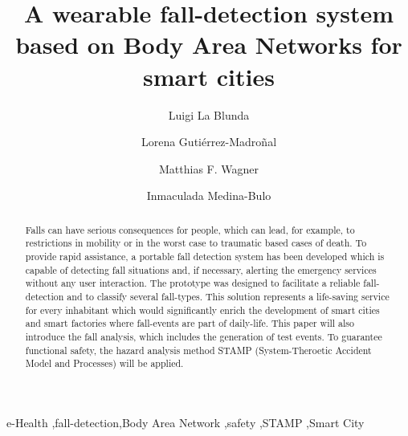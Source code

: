 \documentclass[review]{elsarticle}
\begin{document}
\begin{frontmatter}

\title{A wearable fall-detection system based on Body Area Networks for smart cities}

\author{Luigi La Blunda}
\author{Lorena Guti\'errez-Madro\~nal}
\author{Matthias F. Wagner}
\author{Inmaculada Medina-Bulo}
\address[label1]{WSN and IOT Research Group Frankfurt University of Applied Sciences, Nibelungenplatz 1, 60318 Frankfurt am Main, Germany}
\address[label2]{UCASE Software Engineering Research group, University of Cadiz, Av. Universidad de Cadiz, 10, 11519 Puerto Real, Spain}



%
%

\begin{abstract}
Falls can have serious consequences for people, which can lead, for example, to restrictions in mobility or in the worst case to traumatic based cases of death. To provide rapid assistance, a portable fall detection system has been developed which is capable of detecting fall situations and, if necessary, alerting the emergency services without any user interaction. The prototype was designed to facilitate a reliable fall-detection and to classify several fall-types. This solution represents a life-saving service for every inhabitant which would significantly enrich the development of smart cities and smart factories where fall-events are part of daily-life. This paper will also introduce the fall analysis, which includes the generation of test events. To guarantee functional safety, the hazard analysis method STAMP (System-Theroetic Accident Model and Processes) will be applied. 
\end{abstract}

\begin{keyword}
e-Health \sep fall-detection\sep Body Area Network \sep safety \sep STAMP \sep Smart City \ 
\end{keyword}

\end{frontmatter}
\end{document}
